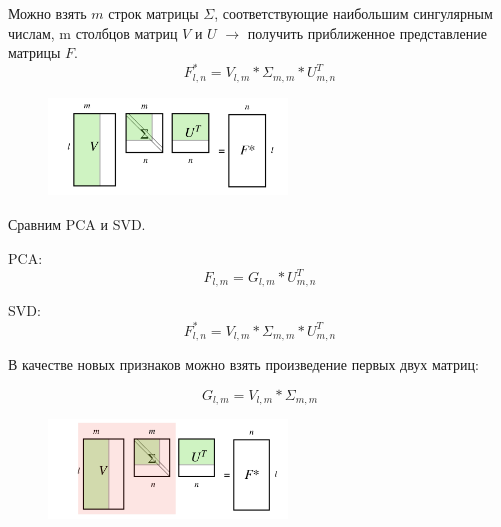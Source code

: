 \documentclass[12pt,a4paper]{article}
\begin{document}
Можно взять $m$ строк матрицы $\Sigma$, соответствующие наибольшим сингулярным числам, m столбцов матриц $V$ и $U$ $\rightarrow$ получить приближенное представление матрицы $F$.
$$
    F^{*}_{l, n} = V_{l, m} * \Sigma_{m, m} * U^T_{m, n}
$$

\begin{figure}[h]
\includegraphics[scale=0.75, width = 240, height = 100]{truncated.png}
\label{ris:image}
\end{figure}

Сравним PCA и SVD.

PCA:\\
$$
    F_{l, m} = G_{l, m} * U^T_{m, n}
$$

SVD:\\
$$
    F^{*}_{l, n} = V_{l, m} * \Sigma_{m, m} * U^T_{m, n}
$$

В качестве новых признаков можно взять произведение первых двух матриц:

$$
    G_{l, m} = V_{l, m} * \Sigma_{m, m}
$$

\begin{figure}[h]
\includegraphics[scale=0.75, width = 240, height = 100]{choose.png}
\label{ris:image}
\end{figure}
\end{document}
